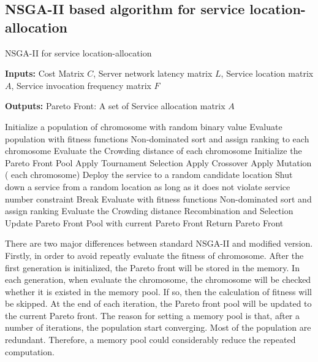 \documentclass{llncs}
\begin{document}



\subsection{NSGA-II based algorithm for service location-allocation}
\begin{algorithm}[htb]
	\caption{NSGA-II for service location-allocation}
	\label{NSGA2}
	\textbf{Inputs:}
		Cost Matrix $C$,
		Server network latency matrix $L$, 
		Service location matrix $A$, 
		Service invocation frequency matrix $F$

	\textbf{Outputs:}
		Pareto Front: A set of Service allocation matrix $A$

	\begin{algorithmic}[1]
		\State Initialize a population of chromosome with random binary value
		\State Evaluate population with fitness functions
		\State Non-dominated sort and assign ranking to each chromosome
		\State Evaluate the Crowding distance of each chromosome
		\State Initialize the Pareto Front Pool
		\State Apply Tournament Selection
		\State Apply Crossover 
		\State Apply Mutation
		\For( each chromosome)
		\State Deploy the service to a random candidate location
		\EndWhile
		\State Shut down a service from a random location as long as it does not violate service number constraint
		\State Break
		\EndIf
		\EndWhile
		\State Evaluate with fitness functions
		\EndIf
		\EndFor
		\State Non-dominated sort and assign ranking
		\State Evaluate the Crowding distance
		\State Recombination and Selection
		\State Update Pareto Front Pool with current Pareto Front
		\EndWhile
		\State Return Pareto Front
	\end{algorithmic}
\end{algorithm}

There are two major differences between standard NSGA-II and modified version. Firstly, in order to avoid repeatly evaluate the fitness
of chromosome. After the first generation is initialized, the Pareto front will be 
stored in the memory. In each generation, when evaluate the chromosome, the chromosome will be checked whether it is existed in the memory pool. 
If so, then the calculation of fitness will be skipped. At the end of each iteration, the Pareto front pool will be updated to the current Pareto front.
The reason for setting a memory pool is that, after a number of iterations, the population start converging. 
Most of the population are redundant. Therefore, a memory pool could considerably reduce the repeated computation.
\end{document}
